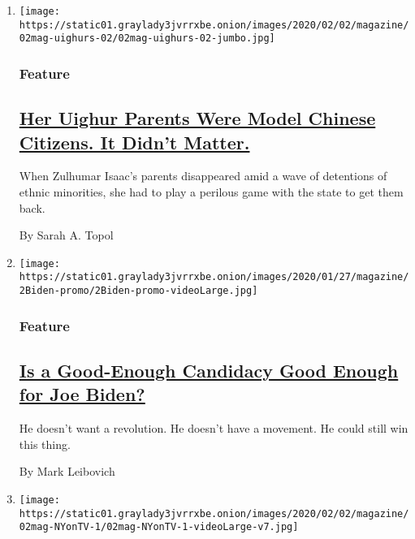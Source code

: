 \begin{enumerate}
\def\labelenumi{\arabic{enumi}.}
\item
  \texttt{[image: https://static01.graylady3jvrrxbe.onion/images/2020/02/02/magazine/02mag-uighurs-02/02mag-uighurs-02-jumbo.jpg]}

  \hypertarget{feature}{%
  \subsubsection{Feature}\label{feature}}

  \hypertarget{her-uighur-parents-were-model-chinese-citizens-it-didnt-matter}{%
  \subsection{\texorpdfstring{\href{/2020/01/29/magazine/uyghur-muslims-china.html}{Her
  Uighur Parents Were Model Chinese Citizens. It Didn't
  Matter.}}{Her Uighur Parents Were Model Chinese Citizens. It Didn't Matter.}}\label{her-uighur-parents-were-model-chinese-citizens-it-didnt-matter}}

  When Zulhumar Isaac's parents disappeared amid a wave of detentions of
  ethnic minorities, she had to play a perilous game with the state to
  get them back.

  By Sarah A. Topol
\item
  \texttt{[image: https://static01.graylady3jvrrxbe.onion/images/2020/01/27/magazine/2Biden-promo/2Biden-promo-videoLarge.jpg]}

  \hypertarget{feature-1}{%
  \subsubsection{Feature}\label{feature-1}}

  \hypertarget{is-a-good-enough-candidacy-good-enough-for-joe-biden}{%
  \subsection{\texorpdfstring{\href{/2020/01/28/magazine/joe-biden-2020.html}{Is
  a Good-Enough Candidacy Good Enough for Joe
  Biden?}}{Is a Good-Enough Candidacy Good Enough for Joe Biden?}}\label{is-a-good-enough-candidacy-good-enough-for-joe-biden}}

  He doesn't want a revolution. He doesn't have a movement. He could
  still win this thing.

  By Mark Leibovich
\item
  \texttt{[image: https://static01.graylady3jvrrxbe.onion/images/2020/02/02/magazine/02mag-NYonTV-1/02mag-NYonTV-1-videoLarge-v7.jpg]}


\end{enumerate}

